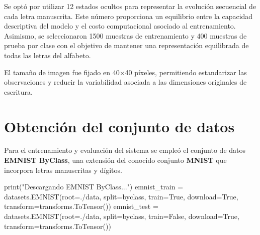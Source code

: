 \documentclass[
  spanish,
  us-letterpaper,
  DIV=11,
  numbers=noendperiod]{scrreprt}
\newenvironment{Shaded}{\begin{snugshade}}{\end{snugshade}}
\newcommand{\BuiltInTok}[1]{\textcolor[rgb]{0.00,0.23,0.31}{#1}}
\newcommand{\NormalTok}[1]{\textcolor[rgb]{0.00,0.23,0.31}{#1}}
\newcommand{\OperatorTok}[1]{\textcolor[rgb]{0.37,0.37,0.37}{#1}}
\newcommand{\StringTok}[1]{\textcolor[rgb]{0.13,0.47,0.30}{#1}}
\newcommand{\VariableTok}[1]{\textcolor[rgb]{0.07,0.07,0.07}{#1}}
\begin{document}
Se optó por utilizar 12 estados ocultos para representar la evolución
secuencial de cada letra manuscrita. Este número proporciona un
equilibrio entre la capacidad descriptiva del modelo y el costo
computacional asociado al entrenamiento. Asimismo, se seleccionaron 1500
muestras de entrenamiento y 400 muestras de prueba por clase con el
objetivo de mantener una representación equilibrada de todas las letras
del alfabeto.

El tamaño de imagen fue fijado en 40×40 píxeles, permitiendo
estandarizar las observaciones y reducir la variabilidad asociada a las
dimensiones originales de escritura.

\section{Obtención del conjunto de
datos}\label{obtenciuxf3n-del-conjunto-de-datos}

Para el entrenamiento y evaluación del sistema se empleó el conjunto de
datos \textbf{EMNIST ByClass}, una extensión del conocido conjunto
\textbf{MNIST} que incorpora letras manuscritas y dígitos.

\begin{Shaded}
\begin{Highlighting}[]

\BuiltInTok{print}\NormalTok{(}\StringTok{"Descargando EMNIST ByClass..."}\NormalTok{)}
\NormalTok{emnist\_train }\OperatorTok{=}\NormalTok{ datasets.EMNIST(root}\OperatorTok{=}\StringTok{\textquotesingle{}./data\textquotesingle{}}\NormalTok{, split}\OperatorTok{=}\StringTok{\textquotesingle{}byclass\textquotesingle{}}\NormalTok{, }
\NormalTok{                                train}\OperatorTok{=}\VariableTok{True}\NormalTok{, download}\OperatorTok{=}\VariableTok{True}\NormalTok{, }
\NormalTok{                                transform}\OperatorTok{=}\NormalTok{transforms.ToTensor())}
\NormalTok{emnist\_test }\OperatorTok{=}\NormalTok{ datasets.EMNIST(root}\OperatorTok{=}\StringTok{\textquotesingle{}./data\textquotesingle{}}\NormalTok{, split}\OperatorTok{=}\StringTok{\textquotesingle{}byclass\textquotesingle{}}\NormalTok{,}
\NormalTok{                                train}\OperatorTok{=}\VariableTok{False}\NormalTok{, download}\OperatorTok{=}\VariableTok{True}\NormalTok{, }
\NormalTok{                                transform}\OperatorTok{=}\NormalTok{transforms.ToTensor())}
\end{Highlighting}
\end{Shaded}
\end{document}
